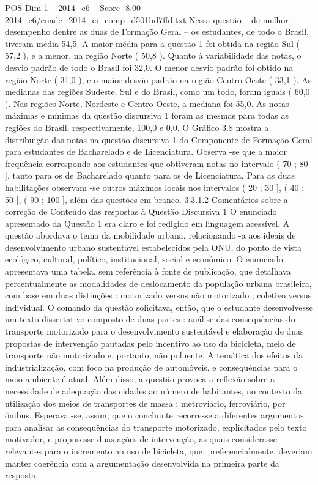 \begin{textsample}{POS Dim 1 – 2014\_c6 – Score -8.00 – 2014\_c6/enade\_2014\_ci\_comp\_d501bd7ffd.txt}
Nessa questão – de melhor desempenho dentre as duas de Formação Geral – os estudantes, de todo o Brasil, tiveram média 54,5.
A maior média para a questão 1 foi obtida na região Sul ( 57,2 ), e a menor, na região Norte ( 50,8 ).
Quanto à variabilidade das notas, o desvio padrão de todo o Brasil foi 32,0.
O menor desvio padrão foi obtido na região Norte ( 31,0 ), e o maior desvio padrão na região Centro-Oeste ( 33,1 ).
As medianas das regiões Sudeste, Sul e do Brasil, como um todo, foram iguais ( 60,0 ).
Nas regiões Norte, Nordeste e Centro-Oeste, a mediana foi 55,0.
As notas máximas e mínimas da questão discursiva 1 foram as mesmas para todas as regiões do Brasil, respectivamente, 100,0 e 0,0.
O Gráfico 3.8 mostra a distribuição das notas na questão discursiva 1 do Componente de Formação Geral para estudantes de Bacharelado e de Licenciatura.
Observa -se que a maior frequência corresponde aos estudantes que obtiveram notas no intervalo ( 70 ; 80 ], tanto para os de Bacharelado quanto para os de Licenciatura.
Para as duas habilitações observam -se outros máximos locais nos intervalos ( 20 ; 30 ], ( 40 ; 50 ], ( 90 ; 100 ], além das questões em branco. 3.3.1.2 Comentários sobre a correção de Conteúdo das respostas à Questão Discursiva 1 O enunciado apresentado da Questão 1 era claro e foi redigido em linguagem acessível.
A questão abordava o tema da mobilidade urbana, relacionando -a aos ideais de desenvolvimento urbano sustentável estabelecidos pela ONU, do ponto de vista ecológico, cultural, político, institucional, social e econômico.
O enunciado apresentava uma tabela, sem referência à fonte de publicação, que detalhava percentualmente as modalidades de deslocamento da população urbana brasileira, com base em duas distinções : motorizado versus não motorizado ; coletivo versus individual.
O comando da questão solicitava, então, que o estudante desenvolvesse um texto dissertativo composto de duas partes : análise das consequências do transporte motorizado para o desenvolvimento sustentável e elaboração de duas propostas de intervenção pautadas pelo incentivo ao uso da bicicleta, meio de transporte não motorizado e, portanto, não poluente.
A temática dos efeitos da industrialização, com foco na produção de automóveis, e consequências para o meio ambiente é atual.
Além disso, a questão provoca a reflexão sobre a necessidade de adequação das cidades ao número de habitantes, no contexto da utilização dos meios de transportes de massa : metroviário, ferroviário, por ônibus.
Esperava -se, assim, que o concluinte recorresse a diferentes argumentos para analisar as consequências do transporte motorizado, explicitados pelo texto motivador, e propusesse duas ações de intervenção, as quais considerasse relevantes para o incremento ao uso de bicicleta, que, preferencialmente, deveriam manter coerência com a argumentação desenvolvida na primeira parte da resposta.

\end{textsample}
